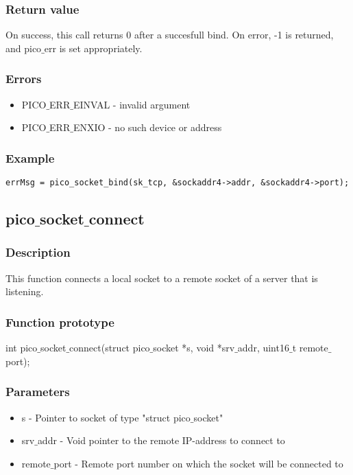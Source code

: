 \subsubsection*{Return value}
On success, this call returns 0 after a succesfull bind.
On error, -1 is returned, and pico$\_$err is set appropriately.

\subsubsection*{Errors}
\begin{itemize}
\item PICO$\_$ERR$\_$EINVAL - invalid argument
\item PICO$\_$ERR$\_$ENXIO - no such device or address
\end{itemize}

\subsubsection*{Example}
\begin{verbatim}
errMsg = pico_socket_bind(sk_tcp, &sockaddr4->addr, &sockaddr4->port);
\end{verbatim}


\subsection{pico$\_$socket$\_$connect}

\subsubsection*{Description}
This function connects a local socket to a remote socket of a server that is listening.

\subsubsection*{Function prototype}
int pico$\_$socket$\_$connect(struct pico$\_$socket *s, void *srv$\_$addr, uint16$\_$t remote$\_$port);

\subsubsection*{Parameters}
\begin{itemize}
\item s - Pointer to socket of type "struct pico$\_$socket"
\item srv$\_$addr - Void pointer to the remote IP-address to connect to
\item remote$\_$port - Remote port number on which the socket will be connected to
\end{itemize} 

